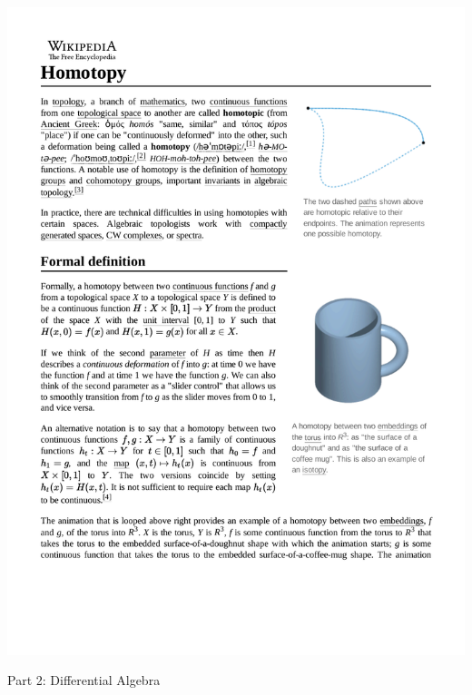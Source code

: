 \documentclass{beamer}
\begin{document}
\begin{frame}
\includegraphics[width=\textwidth]{Homotopy.pdf}
\end{frame}

\begin{frame}
\begin{exampleblock}{}
\begin{center}
\vskip 20pt
\Huge
Part 2: Differential Algebra
\vskip 6pt
\ 
\end{center}
\end{exampleblock}
\end{frame}
\end{document}
